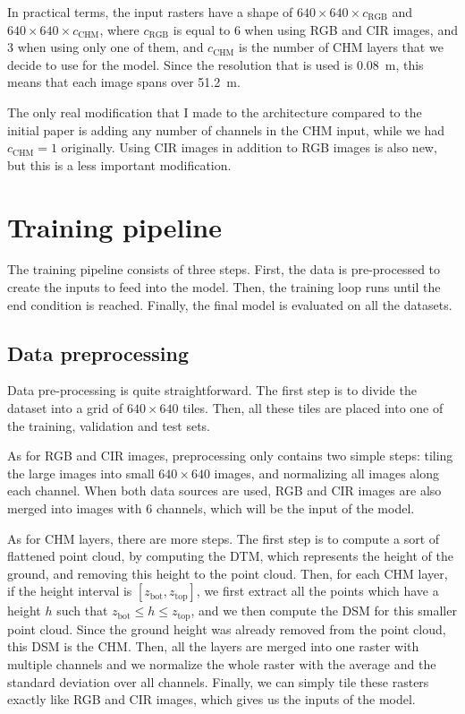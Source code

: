 \documentclass[
]{report}
\begin{document}
In practical terms, the input rasters have a shape of
\(640 \times 640 \times c_{\text{RGB}}\) and
\(640 \times 640 \times c_{\text{CHM}}\), where \(c_{\text{RGB}}\) is
equal to 6 when using RGB and CIR images, and 3 when using only one of
them, and \(c_{\text{CHM}}\) is the number of CHM layers that we decide
to use for the model. Since the resolution that is used is 0.08~m, this
means that each image spans over 51.2~m.

The only real modification that I made to the architecture compared to
the initial paper is adding any number of channels in the CHM input,
while we had \(c_{\text{CHM}} = 1\) originally. Using CIR images in
addition to RGB images is also new, but this is a less important
modification.

\section{Training pipeline}\label{training-pipeline}

The training pipeline consists of three steps. First, the data is
pre-processed to create the inputs to feed into the model. Then, the
training loop runs until the end condition is reached. Finally, the
final model is evaluated on all the datasets.

\subsection{Data preprocessing}\label{data-preprocessing}

Data pre-processing is quite straightforward. The first step is to
divide the dataset into a grid of \(640 \times 640\) tiles. Then, all
these tiles are placed into one of the training, validation and test
sets.

As for RGB and CIR images, preprocessing only contains two simple steps:
tiling the large images into small \(640 \times 640\) images, and
normalizing all images along each channel. When both data sources are
used, RGB and CIR images are also merged into images with 6 channels,
which will be the input of the model.

As for CHM layers, there are more steps. The first step is to compute a
sort of flattened point cloud, by computing the DTM, which represents
the height of the ground, and removing this height to the point cloud.
Then, for each CHM layer, if the height interval is
\([z_\text{bot}, z_\text{top}]\), we first extract all the points which
have a height \(h\) such that \(z_\text{bot} \leq h \leq z_\text{top}\),
and we then compute the DSM for this smaller point cloud. Since the
ground height was already removed from the point cloud, this DSM is the
CHM. Then, all the layers are merged into one raster with multiple
channels and we normalize the whole raster with the average and the
standard deviation over all channels. Finally, we can simply tile these
rasters exactly like RGB and CIR images, which gives us the inputs of
the model.
\end{document}
